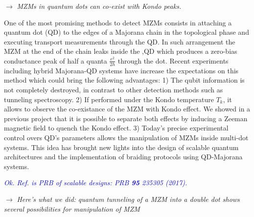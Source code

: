 \documentclass[showpacs,aps,prb,reprint,superscriptaddress]{revtex4-1}
\newcommand{\TS}[1]{{$\rightarrow$ {\sl#1}}}
\newcommand{\LUIS}[1]{\textcolor{blue}{\fbox{Luis} {\sl#1}}}
\begin{document}
\TS{MZMs in quantum dots can co-exist with Kondo peaks.}

One of the most promising methods to detect MZMs consists in attaching a quantum dot (QD) to the edges of a Majorana chain in the topological phase and executing transport measurements through the QD. \cite{liu_detecting_2011}  In such arrangement the MZM at the end of the chain leaks inside the ,QD \cite{vernek_subtle_2014} which produces a zero-bias conductance peak of half a quanta $\frac{e^{2}}{2h}$ through the dot. Recent  experiments including hybrid Majorana-QD systems \cite{deng_majorana_2016,su_andreev_2017} have increase the expectations on this method which could bring the following advantages: 1) The qubit information  is not completely destroyed, in contrast to other detection methods such as tunneling spectroscopy. 2) If performed under the  Kondo temperature $T_k$, it allows to observe the co-existance of the MZM with Kondo effect. \cite{lee_kondo_2013,gorski_interplay_2018} We showed in a previous project that it is possible to separate both  effects by inducing a  Zeeman magnetic field to quench the Kondo effect. \cite{ruiz-tijerina_interaction_2015} 3) Today’s precise experimental control overs QD's parameters allows the manipulation of MZMs inside multi-dot systems. This idea has brought new lights into the design of scalable quantum architectures \cite{barkeshli_physical_2015,karzig_scalable_2017} and the implementation of braiding protocols \cite{malciu_braiding_2018} using QD-Majorana systems.


\LUIS{Ok. Ref.  is PRB of scalable designs: PRB \textbf{95} 235305 (2017). }







\TS{Here's what we did: quantum tunneling of a MZM into a double dot shows several possibilities for manipulation of MZM}
\end{document}
